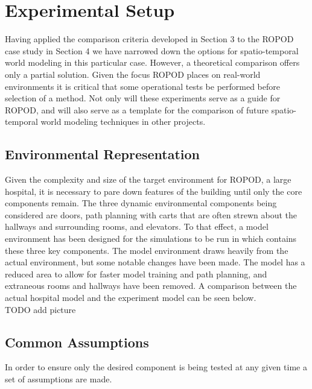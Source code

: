 

  \chapter{Experimental Setup}

  Having applied the comparison criteria developed in Section 3 to the ROPOD case
  study in Section 4 we have narrowed down the options for spatio-temporal
  world modeling in this particular case. However, a theoretical comparison offers
  only a partial solution. Given the focus ROPOD places on real-world
  environments it is critical that some operational tests be performed before
  selection of a method. Not only will these experiments serve as a guide for ROPOD,
  and will also serve as a template for the comparison of future
  spatio-temporal world modeling techniques in other projects. \\

  \section{ Environmental Representation}

  Given the complexity and size of the target environment for ROPOD, a large
  hospital, it is necessary to pare down features of the building until only
  the core components remain. The three dynamic environmental components being
  considered are doors, path planning with carts that are often strewn about the
  hallways and surrounding rooms, and elevators. To that effect, a model
  environment has been designed for the simulations to be run in which contains
  these three key components. The model environment
  draws heavily from the actual environment, but some notable changes have been
  made. The model has a reduced area to allow for faster model training and
  path planning, and extraneous rooms and hallways have been
  removed. A comparison between the actual hospital model and the experiment model can
  be seen below. \\

  TODO add picture


  \section{ Common Assumptions }
  In order to ensure only the desired component is being tested at any given
  time a set of assumptions are made.


